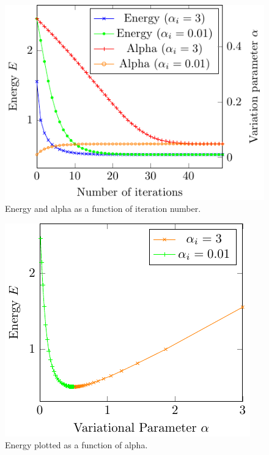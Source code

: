 \begin{figure}[th]
	\begin{center}
		\includegraphics[scale=0.9]{graphs/ho-e-alpha-iterations.pdf}
		\caption{
			Energy and alpha as a function of iteration number. %
			}
		\label{fig:Ho_it}
	\end{center}
\end{figure}
\begin{figure}[th]
	\begin{center}
		\includegraphics[scale=0.9]{graphs/ho-e-alpha.pdf}
		\caption{
			Energy plotted as a function of alpha. %
		}
		\label{fig:Ho_rel}
	\end{center}
\end{figure}
  

